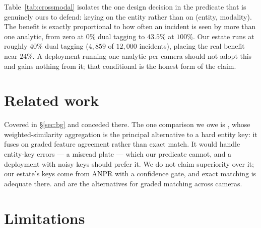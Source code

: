 \documentclass[11pt,a4paper]{article}
\begin{document}
Table~\ref{tab:crossmodal} isolates the one design decision in the predicate that
is genuinely ours to defend: keying on the entity rather than on
(entity, modality). The benefit is exactly proportional to how often an incident is
seen by more than one analytic, from zero at $0\%$ dual tagging to $43.5\%$ at
$100\%$. Our estate runs at roughly $40\%$ dual tagging
($4{,}859$ of $12{,}000$ incidents), placing the real benefit near $24\%$. A
deployment running one analytic per camera should not adopt this and gains
nothing from it; that conditional is the honest form of the claim.

\section{Related work}

Covered in \S\ref{sec:bg} and conceded there. The one comparison we owe is
\citet{valdes2001probabilistic}, whose weighted-similarity aggregation is the
principal alternative to a hard entity key: it fuses on graded feature agreement
rather than exact match. It would handle entity-key errors --- a misread plate ---
which our predicate cannot, and a deployment with noisy keys should prefer it. We
do not claim superiority over it; our estate's keys come from ANPR with a
confidence gate, and exact matching is adequate there.
\citet{cheng2013smithwaterman} and \citet{ye2022reid} are the alternatives for
graded matching across cameras.

\section{Limitations}
\label{sec:limits}
\end{document}

